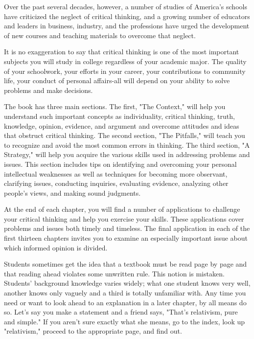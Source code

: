 \documentclass{book}
\begin{document}
Over the past several decades, however, a number of studies of America’s schools have criticized the neglect of critical thinking, and a growing number of educators and leaders in business, industry, and the professions have urged the development of new courses and teaching materials to overcome that neglect.

It is no exaggeration to say that critical thinking is one of the most important subjects you will study in college regardless of your academic major. The quality of your schoolwork, your efforts in your career, your contributions to community life, your conduct of personal affairs-all will depend on your ability to solve problems and make decisions.

The book has three main sections. The first, "The Context," will help you understand such important concepts as individuality, critical thinking, truth, knowledge, opinion, evidence, and argument and overcome attitudes and ideas that obstruct critical thinking. The second section, "The Pitfalls," will teach you to recognize and avoid the most common errors in thinking. The third section, "A Strategy," will help you acquire the various skills used in addressing problems and issues. This section includes tips on identifying and overcoming your personal intellectual weaknesses as well as techniques for becoming more observant, clarifying issues, conducting inquiries, evaluating evidence, analyzing other people’s views, and making sound judgments.

At the end of each chapter, you will find a number of applications to challenge your critical thinking and help you exercise your skills. These applications cover problems and issues both timely and timeless. The final application in each of the first thirteen chapters invites you to examine an especially important issue about which informed opinion is divided.

Students sometimes get the idea that a textbook must be read page by page and that reading ahead violates some unwritten rule. This notion is mistaken. Students’ background knowledge varies widely; what one student knows very well, another knows only vaguely and a third is totally unfamiliar with. Any time you need or want to look ahead to an explanation in a later chapter, by all means do so. Let’s say you make a statement and a friend says, "That’s relativism, pure and simple." If you aren’t sure exactly what she means, go to the index, look up "relativism," proceed to the appropriate page, and find out.
\end{document}
